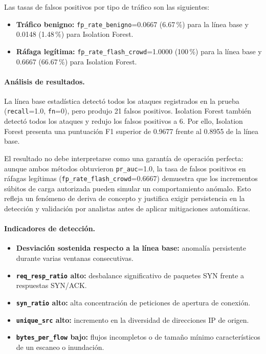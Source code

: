 Las tasas de falsos positivos por tipo de tráfico son las siguientes:

\begin{itemize}
\item \textbf{Tráfico benigno:} \texttt{fp\_rate\_benigno}=0.0667 (6.67\,\%) para la línea base y 0.0148 (1.48\,\%) para Isolation Forest.
\item \textbf{Ráfaga legítima:} \texttt{fp\_rate\_flash\_crowd}=1.0000 (100\,\%) para la línea base y 0.6667 (66.67\,\%) para Isolation Forest.
\end{itemize}

\paragraph{Análisis de resultados.}
La línea base estadística detectó todos los ataques registrados en la prueba (\texttt{recall}=1.0, \texttt{fn}=0), pero produjo 21 falsos positivos. Isolation Forest también detectó todos los ataques y redujo los falsos positivos a 6. Por ello, Isolation Forest presenta una puntuación F1 superior de 0.9677 frente al 0.8955 de la línea base.

El resultado no debe interpretarse como una garantía de operación perfecta: aunque ambos métodos obtuvieron \texttt{pr\_auc}=1.0, la tasa de falsos positivos en ráfagas legítimas (\texttt{fp\_rate\_flash\_crowd}=0.6667) demuestra que los incrementos súbitos de carga autorizada pueden simular un comportamiento anómalo. Esto refleja un fenómeno de deriva de concepto y justifica exigir persistencia en la detección y validación por analistas antes de aplicar mitigaciones automáticas.

\paragraph{Indicadores de detección.}
\begin{itemize}
\item \textbf{Desviación sostenida respecto a la línea base:} anomalía persistente durante varias ventanas consecutivas.
\item \textbf{\texttt{req\_resp\_ratio} alto:} desbalance significativo de paquetes SYN frente a respuestas SYN/ACK.
\item \textbf{\texttt{syn\_ratio} alto:} alta concentración de peticiones de apertura de conexión.
\item \textbf{\texttt{unique\_src} alto:} incremento en la diversidad de direcciones IP de origen.
\item \textbf{\texttt{bytes\_per\_flow} bajo:} flujos incompletos o de tamaño mínimo característicos de un escaneo o inundación.
\end{itemize}

